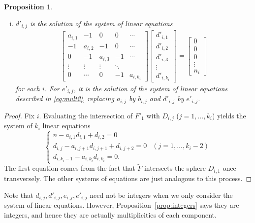 \documentclass[10pt,a4paper,reqno]{amsart}
\newtheorem{prop}[thm]{Proposition}
\theoremstyle{definition}
\numberwithin{equation}{section}
\numberwithin{figure}{section}
\begin{document}
\begin{prop}
\begin{enumerate}[(i)]
\item $d'_{i,j}$ is the solution of the system of linear equations
\begin{align}\label{eq:mult2}
\begin{bmatrix}
a_{i,1} & -1 & 0 & 0  & \cdots \\ 
-1 & a_{i,2} & -1 & 0 & \cdots \\ 
0 &-1 & a_{i,3} & -1 & \cdots \\ 
\vdots & \vdots &\vdots & \ddots  & \\ 
0 & \cdots & 0 & -1 & a_{i, k_{i}} \end{bmatrix}
\begin{bmatrix}
 d'_{i,1} \\ d'_{i,2} \\ d'_{i,3} \\ \vdots \\ d'_{i,k_i}
\end{bmatrix}
=\begin{bmatrix}
0 \\ 0 \\ 0 \\ \vdots \\ n_i
\end{bmatrix}
\end{align} 
for each $i$. 
For $e'_{i,j}$, it is the solution of the system of linear equations described in \eqref{eq:mult2}, replacing $a_{i,j}$ by $b_{i,j}$ and $d'_{i,j}$ by $e'_{i,j}$.
\end{enumerate}
\end{prop}

\begin{proof}
Fix $i$. Evaluating the intersection of $F'_1$ with $D_{i,j}$ ($j=1,\dots, k_i$) yields the system of $k_i$ linear equations
\begin{equation} \label{eq:recursion}
\begin{cases}
n-a_{i,1}d_{i,1}+d_{i,2}=0&  \\
d_{i,j}-a_{i,j+1}d_{i,j+1}+d_{i,j+2}=0 & (j=1,\dots,k_i-2) \\
d_{i,k_i -1}-a_{i,k_i} d_{i,k_i}=0. &
\end{cases}
\end{equation}
The first equation comes from the fact that $\tilde{F}$ intersects the sphere $D_{i,1}$ once transversely.
The other systems of equations are just analogous to this process.
\end{proof}

Note that $d_{i,j}, d'_{i,j}, e_{i,j}, e'_{i,j}$ need not be integers when we only consider the system of linear equations.
However, Proposition~\ref{prop:integers} says they are integers, and hence they are actually multiplicities of each component.
\end{document}
